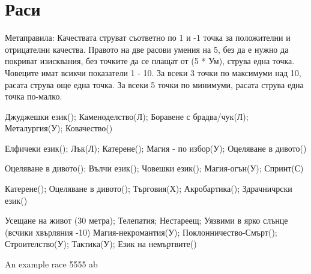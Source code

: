 \section{Раси}
Метаправила:
Качествата струват съответно по 1 и -1 точка за положителни и отрицателни качества.
Правото на две расови умения на 5, без да е нужно да покриват изисквания, без точките да се плащат от (5 * Ум), струва една точка.
Човеците имат всикчи показатели 1 - 10.
За всеки 3 точки по максимуми над 10, расата струва още една точка.
За всеки 5 точки по минимуми, расата струва една точка по-малко.
\\
\begin{multicols}{2}

{
Джуджешки език();
Каменоделство(Л);
Боравене с брадва/чук(Л);
Металургия(У);
Ковачество()
}

{
Елфичеки език();
Лък(Л);
Катерене();
Магия - по избор(У);
Оцеляване в дивото()
}

{
Оцеляване в дивото();
Вълчи език();
Човешки език();
Магия-огън(У);
Спринт(С)
}

{
Катерене();
Оцеляване в дивото();
Търговия(Х);
Акробартика();
Здрачничрски език()
}

{
Усещане на живот (30 метра);
Телепатия;
Нестареещ;
Уязвими в ярко слънце (всчики хвърляния -10)
}
{
Магия-некромантия(У);
Поклонничество-Смърт();
Строителство(У);
Тактика(У);
Език на немъртвите()
}

{An example race}
{5}{5}{5}{5}
{a}{b}

\end{multicols}

